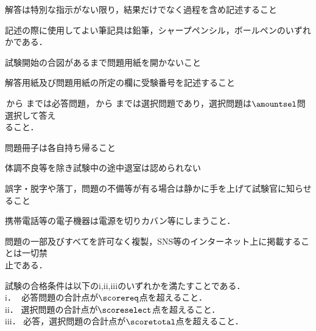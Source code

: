 \item\;  解答は特別な指示がない限り，結果だけでなく過程を含め記述すること
\item\;  記述の際に使用してよい筆記具は鉛筆，シャープペンシル，ボールペンのいずれかである．
\item\;  試験開始の合図があるまで問題用紙を開かないこと
\item\;  解答用紙及び問題用紙の所定の欄に受験番号を記述すること
\item\;  \fbox{\hreq}\,から\,\fbox{\ereq}\,までは必答問題，\fbox{\hselect}\,から\,\fbox{\eselect}\,までは選択問題であり，選択問題は$\amountsel$問選択して答え\\[2mm]
         \hspace{0.2cm}ること．
\item\;  問題冊子は各自持ち帰ること
\item\;  体調不良等を除き試験中の途中退室は認められない
\item\;  誤字・脱字や落丁，問題の不備等が有る場合は静かに手を上げて試験官に知らせること
\item\;  携帯電話等の電子機器は電源を切りカバン等にしまうこと．
\item\;  問題の一部及びすべてを許可なく複製，SNS等のインターネット上に掲載することは一切禁\\[2mm]
         \hspace{0.2cm}止である．
\item\;  試験の合格条件は以下のi,ii,iiiのいずれかを満たすことである．\\[2mm]
         \hspace{0.2cm}   i．\;\;\,\, 必答問題の合計点が$\scorereq$点を超えること．\\[2mm]
         \hspace{0.2cm}  ii．\;\; 選択問題の合計点が$\scoreselect$点を超えること．\\[2mm]
         \hspace{0.2cm} iii．\; 必答，選択問題の合計点が$\scoretotal$点を超えること．